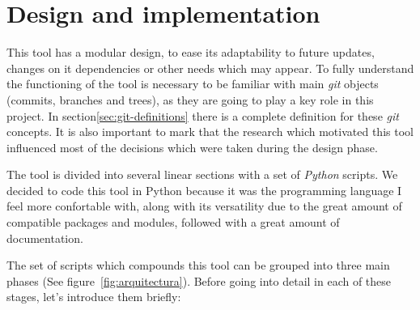 \documentclass[a4paper, 12pt]{book}
\begin{document}
\chapter{Design and implementation}
\label{sec:design-implementation}
This tool has a modular design, to ease its adaptability to future updates, changes on it dependencies or other needs which may appear.
To fully understand the functioning of the tool is necessary to be familiar with main \emph{git} objects (commits, branches and trees),
as they are going to play a key role in this project. In section\ref{sec:git-definitions} there is a complete definition for these \emph{git} concepts.
It is also important to mark that the research which motivated this tool influenced most of the decisions which were taken during the design phase.\par
The tool is divided into several linear sections with a set of \emph{Python} scripts. We decided to code this tool in Python because it was the programming
language I feel more confortable with, along with its versatility due to the great amount of compatible packages and modules, followed
with a great amount of documentation.\par
The set of scripts which compounds this tool can be grouped into three main phases (See figure~\ref{fig:arquitectura}).
Before going into detail in each of these stages, let's introduce them briefly:
\end{document}

